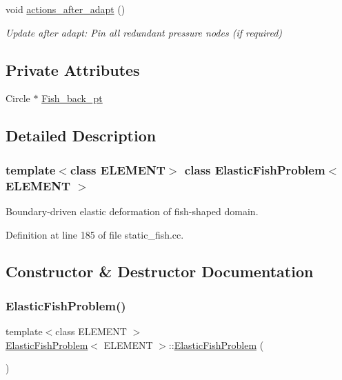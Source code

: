 \begin{DoxyCompactItemize}
void \hyperlink{classElasticFishProblem_ae54b974caafe717309ce7abc5e7f824d}{actions\+\_\+after\+\_\+adapt} ()
\begin{DoxyCompactList}\small\item\em Update after adapt\+: Pin all redundant pressure nodes (if required) \end{DoxyCompactList}\end{DoxyCompactItemize}
\subsection*{Private Attributes}
\begin{DoxyCompactItemize}
\item 
Circle $\ast$ \hyperlink{classElasticFishProblem_a1a026c063e41c004f656988d6bfd541b}{Fish\+\_\+back\+\_\+pt}
\end{DoxyCompactItemize}


\subsection{Detailed Description}
\subsubsection*{template$<$class E\+L\+E\+M\+E\+NT$>$\newline
class Elastic\+Fish\+Problem$<$ E\+L\+E\+M\+E\+N\+T $>$}

Boundary-\/driven elastic deformation of fish-\/shaped domain. 

Definition at line 185 of file static\+\_\+fish.\+cc.



\subsection{Constructor \& Destructor Documentation}
\mbox{\label{classElasticFishProblem_adf9fdb0b94ac76b7fdb34bc7fa809a41}} 
\subsubsection{\texorpdfstring{Elastic\+Fish\+Problem()}{ElasticFishProblem()}}
{\footnotesize\ttfamily template$<$class E\+L\+E\+M\+E\+NT $>$ \\
\hyperlink{classElasticFishProblem}{Elastic\+Fish\+Problem}$<$ E\+L\+E\+M\+E\+NT $>$\+::\hyperlink{classElasticFishProblem}{Elastic\+Fish\+Problem} (\begin{DoxyParamCaption}{ }\end{DoxyParamCaption})}



